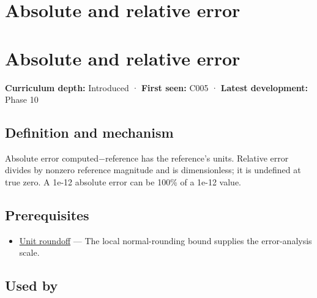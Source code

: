 \hypertarget{appendix-3ae74e89b4e6}{}
\section*{Absolute and relative error}
\section{Absolute and relative error}\label{appendix-3ae74e89b4e6-absolute-and-relative-error}

\textbf{Curriculum depth:} Introduced · \textbf{First seen:} C005 · \textbf{Latest development:} Phase 10

\subsection{Definition and mechanism}\label{appendix-3ae74e89b4e6-definition-and-mechanism}

Absolute error \textbar computed−reference\textbar{} has the reference's units. Relative error divides by nonzero reference magnitude and is dimensionless; it is undefined at true zero. A 1e-12 absolute error can be 100\% of a 1e-12 value.

\subsection{Prerequisites}\label{appendix-3ae74e89b4e6-prerequisites}

\begin{itemize}
\tightlist
\item
  \hyperref[appendix-bc44f7b42f42]{Unit roundoff} --- The local normal-rounding bound supplies the error-analysis scale.
\end{itemize}

\subsection{Used by}\label{appendix-3ae74e89b4e6-used-by}

